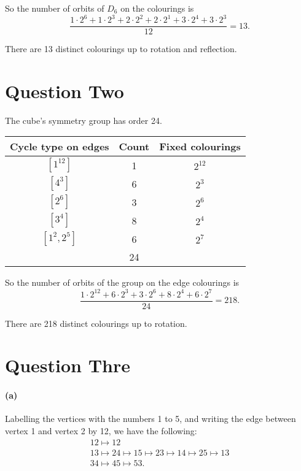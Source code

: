 \documentclass[a4paper,10pt]{amsart}
\begin{document}
So the number of orbits of $ D_6 $ on the colourings is
\begin{displaymath}
  \frac{1 \cdot 2^6 + 1 \cdot 2^3 + 2 \cdot 2^2 + 2 \cdot 2^1 + 3 \cdot 2^4 + 3 \cdot 2^3}{12} = 13.
\end{displaymath}

There are 13 distinct colourings up to rotation and reflection.

\section*{Question Two}
The cube's symmetry group has order 24.
\begin{center}\begin{tabular}{|c|c|c|}\hline
  \textbf{Cycle type on edges} & \textbf{Count} & \textbf{Fixed colourings}\\\hline
  $[1^{12}]$ & 1 & $ 2^{12} $\\
  $[4^3]$ & 6 & $ 2^3 $\\
  $[2^6]$ & 3 & $ 2^6 $\\
  $[3^4]$ & 8 & $ 2^4 $\\
  $[1^2,2^5]$ & 6 & $ 2^7 $\\\hline
   & 24 &\\\hline
\end{tabular}\end{center}

So the number of orbits of the group on the edge colourings is
\begin{displaymath}
  \frac{1 \cdot 2^{12} + 6 \cdot 2^3 + 3 \cdot 2^6 + 8 \cdot 2^4 + 6 \cdot 2^7}{24} = 218.
\end{displaymath}

There are 218 distinct colourings up to rotation.

\section*{Question Thre}
\paragraph{(a)}
Labelling the vertices with the numbers 1 to 5, and writing the edge between vertex 1 and vertex 2 by 12, we have the following:
\begin{gather*}
  12 \mapsto 12\\
  13 \mapsto 24 \mapsto 15 \mapsto 23 \mapsto 14 \mapsto 25 \mapsto 13\\
  34 \mapsto 45 \mapsto 53.
\end{gather*}
\end{document}
